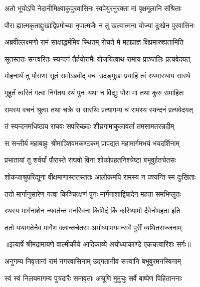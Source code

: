 \twolineshloka
{अतो भूयोऽपि नेदानीमिक्ष्वाकुपुरवासिनः}
{स्वपेयुरनुरक्ता मां वृक्षमूलानि संश्रिताः} %

\twolineshloka
{पौरा ह्यात्मकृताद्दुःखाद्विप्रमोच्या नृपात्मजैः}
{न तु खल्वात्मना योज्या दुःखेन पुरवासिनः} %

\twolineshloka
{अब्रवील्लक्ष्मणो रामं साक्षाद्धर्ममिव स्थितम्}
{रोचते मे महाप्राज्ञ क्षिप्रमारुह्यतामिति} %

\twolineshloka
{सूतस्ततः सन्त्वरितः स्यन्दनं तैर्हयोत्तमैः}
{योजयित्वाथ रामाय प्राञ्जलिः प्रत्यवेदयत्} %

\twolineshloka
{मोहनार्थं तु पौराणां सूतं रामोऽब्रवीद् वचः}
{उदङ्मुखः प्रयाहि त्वं रथमास्थाय सारथे} %

\twolineshloka
{मुहूर्तं त्वरितं गत्वा निर्गतय रथं पुनः}
{यथा न विद्युः पौरा मां तथा कुरु समाहितः} %

\twolineshloka
{रामस्य वचनं श्रुत्वा तथा चक्रे स सारथिः}
{प्रत्यागम्य च रामस्य स्यन्दनं प्रत्यवेदयत्} %

\twolineshloka
{तं स्यन्दनमधिष्ठाय राघवः सपरिच्छदः}
{शीघ्रगामाकुलावर्तां तमसामतरन्नदीम्} %

\twolineshloka
{स सन्तीर्य महाबाहुः श्रीमाञ्शिवमकण्टकम्}
{प्रापद्यत महामार्गमभयं भयदर्शिनाम्} %

\twolineshloka
{प्रभातायां तु शर्वर्यां पौरास्ते राघवो विना}
{शोकोपहतनिश्चेष्टा बभूवुर्हतचेतसः} %

\twolineshloka
{शोकजाश्रुपरिद्यूना वीक्षमाणास्ततस्ततः}
{आलोकमपि रामस्य न पश्यन्ति स्म दुःखिताः} %

\twolineshloka
{ततो मार्गानुसारेण गत्वा किञ्चित्क्षणं पुनः}
{मार्गनाशाद्विषादेन महता समभिप्लुतः} %

\twolineshloka
{रथस्य मार्गनाशेन न्यवर्तन्त मनस्विनः}
{किमिदं किं करिष्यामो दैवेनोपहता इति} %

\twolineshloka
{ततो यथागतेनैव मार्गेण क्लान्तचेतसः}
{अयोध्यामगमन्सर्वे पुरीं व्यथितसज्जनाम्} %


{॥इत्यार्षे श्रीमद्रामायणे वाल्मीकीये आदिकाव्ये अयोध्याकाण्डे एकचत्वारिंशः सर्गः॥}


\twolineshloka
{अनुगम्य निवृत्तानां रामं नगरवासिनाम्}
{उद्गतानीव सत्त्वानि बभूवुरमनस्विनाम्} %

\twolineshloka
{स्वं स्वं निलयमागम्य पुत्रदारैः समावृताः}
{अश्रूणि मुमुचुः सर्वे बाष्पेण पिहिताननाः} %

